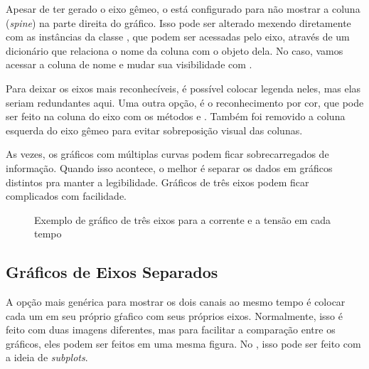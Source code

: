     Apesar de ter gerado o eixo gêmeo, o \matplotlib está configurado para não mostrar a coluna (\textit{spine}) na parte direita do gráfico. Isso pode ser alterado mexendo diretamente com as instâncias da classe , que podem ser acessadas pelo eixo, através de um dicionário que relaciona o nome da coluna com o objeto dela. No caso, vamos acessar a coluna de nome  e mudar sua visibilidade com .

    Para deixar os eixos mais reconhecíveis, é possível colocar legenda neles, mas elas seriam redundantes aqui. Uma outra opção, é o reconhecimento por cor, que pode ser feito na coluna do eixo com os métodos  e . Também foi removido a coluna esquerda do eixo gêmeo para evitar sobreposição visual das colunas.

    \begin{nota}
        As vezes, os gráficos com múltiplas curvas podem ficar sobrecarregados de informação. Quando isso acontece, o melhor é separar os dados em gráficos distintos pra manter a legibilidade. Gráficos de três eixos podem ficar complicados com facilidade.
    \end{nota}

    \begin{figure}[H]
        \centering
        

        \caption{Exemplo de gráfico de três eixos para a corrente e a tensão em cada tempo}
        \label{fig:multiv:duplo}
    \end{figure}


\subsection{Gráficos de Eixos Separados}

    A opção mais genérica para mostrar os dois canais ao mesmo tempo é colocar cada um em seu próprio gŕafico com seus próprios eixos. Normalmente, isso é feito com duas imagens diferentes, mas para facilitar a comparação entre os gráficos, eles podem ser feitos em uma mesma figura. No \matplotlib, isso pode ser feito com a ideia de \textit{subplots}.

